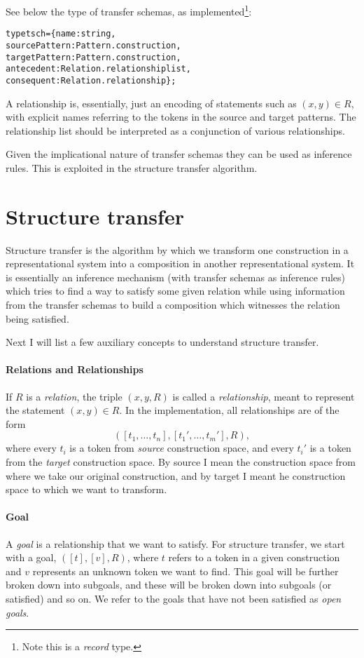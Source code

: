 \documentclass[a4paper]{article}
\theoremstyle{definition}
\begin{document}
	See below the type of transfer schemas, as implemented\footnote{Note this is a \textit{record} type.}:
	\begin{alltt}
type tsch = \{name : string,
             sourcePattern : Pattern.construction,
             targetPattern : Pattern.construction,
             antecedent : Relation.relationship list,
             consequent : Relation.relationship\};
	\end{alltt}
	A relationship is, essentially, just an encoding of statements such as $(x,y)\in R$, with explicit names referring to the tokens in the source and target patterns. The relationship list should be interpreted as a conjunction of various relationships.

	Given the implicational nature of transfer schemas they can be used as inference rules. This is exploited in the structure transfer algorithm.

	\section{Structure transfer}
	Structure transfer is the algorithm by which we transform one construction in a representational system into a composition in another representational system. It is essentially an inference mechanism (with transfer schemas as inference rules) which tries to find a way to satisfy some given relation while using information from the transfer schemas to build a composition which witnesses the relation being satisfied.

	Next I will list a few auxiliary concepts to understand structure transfer.
	\paragraph{Relations and Relationships}
	If $R$ is a \textit{relation}, the triple $(x,y,R)$ is called a \textit{relationship}, meant to represent the statement $(x,y) \in R$. In the implementation, all relationships are of the form $$([t_1,\ldots,t_n],[t_1',\ldots,t_m'],R),$$ where every $t_i$ is a token from \textit{source} construction space, and every $t_i'$ is a token from the \textit{target} construction space. By source I mean the construction space from where we take our original construction, and by target I meant he construction space to which we want to transform.

	\paragraph{Goal} A \textit{goal} is a relationship that we want to satisfy. For structure transfer, we start with a goal, $([t],[v],R)$, where $t$ refers to a token in a given construction and $v$ represents an unknown token we want to find. This goal will be further broken down into subgoals, and these will be broken down into subgoals (or satisfied) and so on. We refer to the goals that have not been satisfied as \textit{open goals}.
\end{document}
